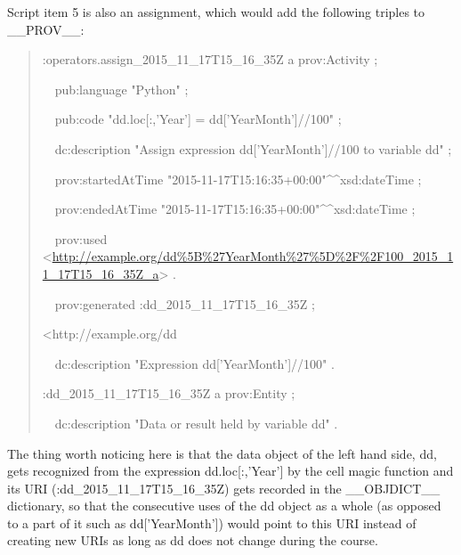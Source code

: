 Script item 5 is also an assignment, which would add the following triples to \_\_PROV\_\_:
\begin{quotation}
	\noindent :operators.assign\_2015\_11\_17T15\_16\_35Z a prov:Activity ;
	
	\noindent\ \ pub:language "Python" ;
	
	\noindent\ \ pub:code "dd.loc[:,'Year'] = dd['YearMonth']//100" ;
	
	\noindent\ \ dc:description "Assign expression dd['YearMonth']//100 to variable dd" ;
	
	\noindent\ \ prov:startedAtTime "2015-11-17T15:16:35+00:00"\^{}\^{}xsd:dateTime ;
	
	\noindent\ \ prov:endedAtTime "2015-11-17T15:16:35+00:00"\^{}\^{}xsd:dateTime ;
	
	\noindent\ \ prov:used <\url{http://example.org/dd%5B%27YearMonth%27%5D%2F%2F100_2015_11_17T15_16_35Z_a}> .
	
	\noindent\ \ prov:generated :dd\_2015\_11\_17T15\_16\_35Z ;
	
	\noindent<http://example.org/dd%
	
	\noindent\ \ dc:description "Expression dd['YearMonth']//100" .
	
	\noindent:dd\_2015\_11\_17T15\_16\_35Z a prov:Entity ;
	
	\noindent\ \ dc:description "Data or result held by variable dd" .
\end{quotation}
The thing worth noticing here is that the data object of the left hand side, dd, gets recognized from the expression dd.loc[:,'Year'] by the cell magic function and its URI (:dd\_2015\_11\_17T15\_16\_35Z) gets recorded in the \_\_OBJDICT\_\_ dictionary, so that the consecutive uses of the dd object as a whole (as opposed to a part of it such as dd['YearMonth']) would point to this URI instead of creating new URIs as long as dd does not change during the course.

